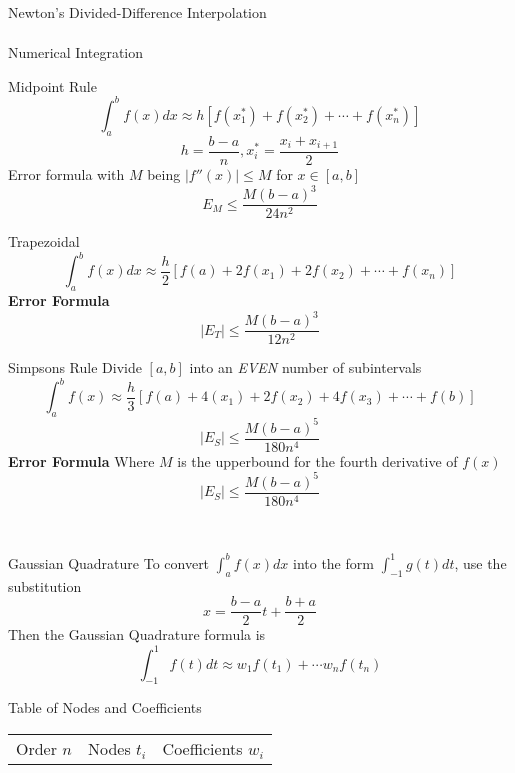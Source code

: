 \documentclass{article}
\begin{document}
\begin{multicols*}{3}
\begin{blackbox}{Newton's Divided-Difference Interpolation}
{\begin{align*}
        \end{align*}
        }
    \end{blackbox}
    \begin{blackbox}{Numerical Integration}
        {\footnotesize
            \begin{bluebox}{Midpoint Rule}
                \[\int_a^b f(x)dx \approx h[f(x_1^*) + f(x_2^*) + \cdots + f(x_n^*)]\]
                \[h = \frac{b-a}{n}, x_i^* = \frac{x_i + x_{i+1}}{2}\]
                Error formula with $M$ being $|f''(x)| \leq M$ for $x \in [a,b]$
                \[E_M \leq \frac{M(b-a)^3}{24n^2}\]
            \end{bluebox}
            \begin{brownbox}{Trapezoidal}
                \[\int_a^b f(x)dx\approx \frac{h}{2}\left[f(a) + 2f(x_1) + 2f(x_2) + \cdots + f(x_n)\right]\]
                \textbf{Error Formula}\\[-2ex]
                \[|E_T| \leq \frac{M(b-a)^3}{12n^2}\]
            \end{brownbox}
            \begin{pinkbox}{Simpsons Rule}
                Divide $[a,b]$ into an \emph{EVEN} number of subintervals\\[-2ex]
                \[\int_a^b f(x) \approx \frac{h}{3}\left[f(a) + 4(x_1) + 2f(x_2) + 4f(x_3) + \cdots + f(b)\right]\]
                \[|E_S| \leq \frac{M(b-a)^5}{180n^4}\]
                \textbf{Error Formula} Where  $M$ is the upperbound for the fourth derivative of $f(x)$\\[-2ex]
                \[|E_S| \leq \frac{M(b-a)^5}{180n^4}\]
            \end{pinkbox}\\[-2ex]
        }
    \end{blackbox}
    \begin{blackbox}{Gaussian Quadrature}
        To convert $\int_a^bf(x)dx$ into the form $\int_{-1}^1g(t)dt$, use the substitution\\[-4ex]
        \[x = \frac{b-a}{2}t + \frac{b+a}{2}\]
        Then the Gaussian Quadrature formula is\\[-2ex]
        \[\int_{-1}^{1}f(t)dt \approx w_1f(t_1) + \cdots w_nf(t_n)\]
        \begin{redbox}{Table of Nodes and Coefficients}
            \begin{center}
                \begin{tabular}{c|cc}
                    Order $n$ & Nodes $t_i$ & Coefficients $w_i$\\

\end{tabular}
\end{center}
\end{redbox}
\end{blackbox}
\end{multicols*}
\end{document}
